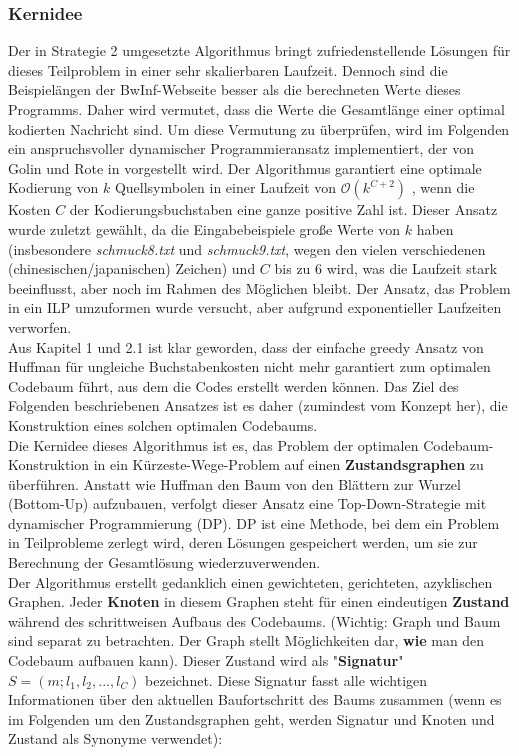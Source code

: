 \documentclass[a4paper,10pt,ngerman]{scrartcl}
\begin{document}
\subsubsection{Kernidee}
Der in Strategie 2 umgesetzte Algorithmus bringt zufriedenstellende Lösungen für dieses Teilproblem in einer sehr skalierbaren Laufzeit. Dennoch sind die Beispielängen der BwInf-Webseite besser als die berechneten Werte dieses Programms. Daher wird vermutet, dass die Werte die Gesamtlänge einer optimal kodierten Nachricht sind. Um diese Vermutung zu überprüfen, wird im Folgenden ein anspruchsvoller dynamischer Programmieransatz implementiert, der von Golin und Rote in \cite{papergolinrote} vorgestellt wird. Der Algorithmus garantiert eine optimale Kodierung von $k$ Quellsymbolen in einer Laufzeit von $\mathcal{O}(k^{C+2})$ , wenn die Kosten $C$ der Kodierungsbuchstaben eine ganze positive Zahl ist. Dieser Ansatz wurde zuletzt gewählt, da die Eingabebeispiele große Werte von $k$ haben (insbesondere \textit{schmuck8.txt} und \textit{schmuck9.txt}, wegen den vielen verschiedenen (chinesischen/japanischen) Zeichen) und $C$ bis zu 6 wird, was die Laufzeit stark beeinflusst, aber noch im Rahmen des Möglichen bleibt. Der Ansatz, das Problem in ein ILP umzuformen wurde versucht, aber aufgrund exponentieller Laufzeiten verworfen. \\
\newline
Aus Kapitel 1 und 2.1 ist klar geworden, dass der einfache greedy Ansatz von Huffman für ungleiche Buchstabenkosten nicht mehr garantiert zum optimalen Codebaum führt, aus dem die Codes erstellt werden können. Das Ziel des Folgenden beschriebenen Ansatzes ist es daher (zumindest vom Konzept her), die Konstruktion eines solchen optimalen Codebaums. 
\\\newline
Die Kernidee dieses Algorithmus ist es, das Problem der optimalen Codebaum-Konstruktion in ein Kürzeste-Wege-Problem auf einen \textbf{Zustandsgraphen} zu überführen. Anstatt wie Huffman den Baum von den Blättern zur Wurzel (Bottom-Up) aufzubauen, verfolgt dieser Ansatz eine Top-Down-Strategie mit dynamischer Programmierung (DP). DP ist eine Methode, bei dem ein Problem in Teilprobleme zerlegt wird, deren Lösungen gespeichert werden, um sie zur Berechnung der Gesamtlösung wiederzuverwenden.
\\\newline
Der Algorithmus erstellt gedanklich einen gewichteten, gerichteten, azyklischen Graphen. Jeder \textbf{Knoten} in diesem Graphen steht für einen eindeutigen \textbf{Zustand} während des schrittweisen Aufbaus des Codebaums. (Wichtig: Graph und Baum sind separat zu betrachten. Der Graph stellt Möglichkeiten dar, \textbf{wie} man den Codebaum aufbauen kann). Dieser Zustand wird als "\textbf{Signatur}" $S = (m; l_1, l_2, ..., l_C)$ bezeichnet. Diese Signatur fasst alle wichtigen Informationen über den aktuellen Baufortschritt des Baums zusammen (wenn es im Folgenden um den Zustandsgraphen geht, werden Signatur und Knoten und Zustand als Synonyme verwendet):
\end{document}
